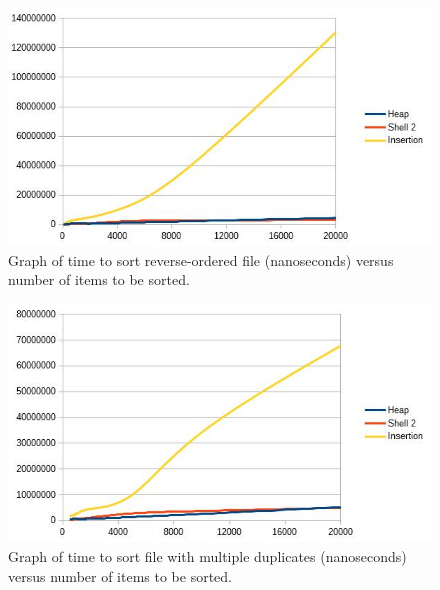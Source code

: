 \documentclass[12pt, titlepage]{article}
\begin{document}
\newpage

\begin{figure} [!htbp]
	\centering
	\includegraphics[width=5in]{rev2}
	\caption{Graph of time to sort reverse-ordered file (nanoseconds) versus number of items to be sorted.}
\end{figure}

\begin{figure} [!htbp]
	\centering
	\includegraphics[width=5in]{dup2}
	\caption{Graph of time to sort file with multiple duplicates (nanoseconds) versus number of items to be sorted.}
\end{figure}
\end{document}
